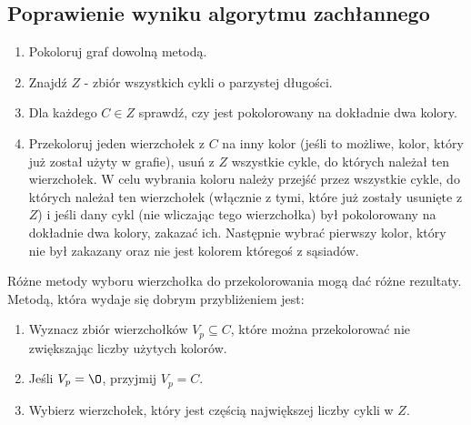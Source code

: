 \documentclass{article}
\begin{document}
\subsection{Poprawienie wyniku algorytmu zachłannego}
\begin{enumerate}
\item Pokoloruj graf dowolną metodą.
\item Znajdź $Z$ - zbiór wszystkich cykli o parzystej długości.
\item Dla każdego $C \in Z$ sprawdź, czy jest pokolorowany na dokładnie dwa kolory.
\item Przekoloruj jeden wierzchołek z $C$ na inny kolor (jeśli to możliwe, kolor, który już został użyty w grafie), usuń z $Z$ wszystkie cykle, do których należał ten wierzchołek. W celu wybrania koloru należy przejść przez wszystkie cykle, do których należał ten wierzchołek (włącznie z tymi, które już zostały usunięte z $Z$) i jeśli dany cykl (nie wliczając tego wierzchołka) był pokolorowany na dokładnie dwa kolory, zakazać ich. Następnie wybrać pierwszy kolor, który nie był zakazany oraz nie jest kolorem któregoś z sąsiadów.
\end{enumerate}
Różne metody wyboru wierzchołka do przekolorowania mogą dać różne rezultaty. Metodą, która wydaje się dobrym przybliżeniem jest:
\begin{enumerate}
\item Wyznacz zbiór wierzchołków $V_p \subseteq C$, które można przekolorować nie zwiększając liczby użytych kolorów.
\item Jeśli $V_p = \O$, przyjmij $V_p = C$.
\item Wybierz wierzchołek, który jest częścią największej liczby cykli w $Z$. 
\end{enumerate}
\end{document}
